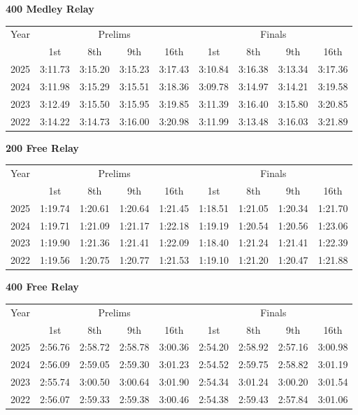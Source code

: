 \textbf{400 Medley Relay}

\begin{flushleft}
\begin{tabular}{|c|c|c|c|c|c|c|c|c|}
\hline
Year & \multicolumn{4}{c|}{Prelims} & \multicolumn{4}{c|}{Finals} \\
\cline{2-9}
& 1st & 8th & 9th & 16th & 1st & 8th & 9th & 16th \\
\hline
2025 & 3:11.73 & 3:15.20 & 3:15.23 & 3:17.43 & 3:10.84 & 3:16.38 & 3:13.34 & 3:17.36 \\
2024 & 3:11.98 & 3:15.29 & 3:15.51 & 3:18.36 & 3:09.78 & 3:14.97 & 3:14.21 & 3:19.58 \\
2023 & 3:12.49 & 3:15.50 & 3:15.95 & 3:19.85 & 3:11.39 & 3:16.40 & 3:15.80 & 3:20.85 \\
2022 & 3:14.22 & 3:14.73 & 3:16.00 & 3:20.98 & 3:11.99 & 3:13.48 & 3:16.03 & 3:21.89 \\
\hline
\end{tabular}
\end{flushleft}

\textbf{200 Free Relay}

\begin{flushleft}
\begin{tabular}{|c|c|c|c|c|c|c|c|c|}
\hline
Year & \multicolumn{4}{c|}{Prelims} & \multicolumn{4}{c|}{Finals} \\
\cline{2-9}
& 1st & 8th & 9th & 16th & 1st & 8th & 9th & 16th \\
\hline
2025 & 1:19.74 & 1:20.61 & 1:20.64 & 1:21.45 & 1:18.51 & 1:21.05 & 1:20.34 & 1:21.70 \\
2024 & 1:19.71 & 1:21.09 & 1:21.17 & 1:22.18 & 1:19.19 & 1:20.54 & 1:20.56 & 1:23.06 \\
2023 & 1:19.90 & 1:21.36 & 1:21.41 & 1:22.09 & 1:18.40 & 1:21.24 & 1:21.41 & 1:22.39 \\
2022 & 1:19.56 & 1:20.75 & 1:20.77 & 1:21.53 & 1:19.10 & 1:21.20 & 1:20.47 & 1:21.88 \\
\hline
\end{tabular}
\end{flushleft}

\clearpage
\textbf{400 Free Relay}

\begin{flushleft}
\begin{tabular}{|c|c|c|c|c|c|c|c|c|}
\hline
Year & \multicolumn{4}{c|}{Prelims} & \multicolumn{4}{c|}{Finals} \\
\cline{2-9}
& 1st & 8th & 9th & 16th & 1st & 8th & 9th & 16th \\
\hline
2025 & 2:56.76 & 2:58.72 & 2:58.78 & 3:00.36 & 2:54.20 & 2:58.92 & 2:57.16 & 3:00.98 \\
2024 & 2:56.09 & 2:59.05 & 2:59.30 & 3:01.23 & 2:54.52 & 2:59.75 & 2:58.82 & 3:01.19 \\
2023 & 2:55.74 & 3:00.50 & 3:00.64 & 3:01.90 & 2:54.34 & 3:01.24 & 3:00.20 & 3:01.54 \\
2022 & 2:56.07 & 2:59.33 & 2:59.38 & 3:00.46 & 2:54.38 & 2:59.43 & 2:57.84 & 3:01.06 \\
\hline
\end{tabular}
\end{flushleft}


